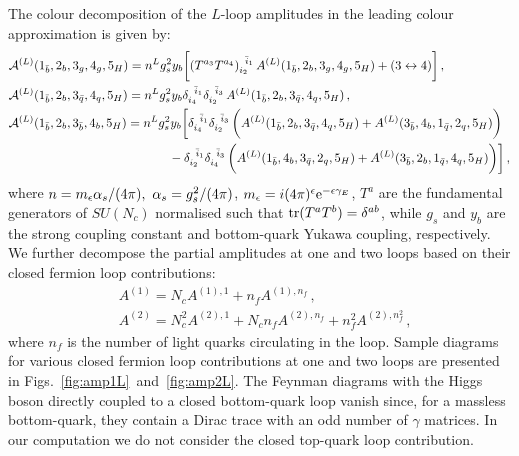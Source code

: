 \documentclass[main.tex]{subfiles}
\begin{document}
The colour decomposition of the $L$-loop amplitudes in the leading colour approximation is given by:
\begin{align}
&\mathcal{A}^{(L)}(1_{\bar b},2_{b},3_{g},4_{g} ,5_{H}) = n^L g_s^2 y_b \bigg[ 
  (T^{a_3} T^{a_4})_{i_2}^{\;\;\bar i_1} \,  A^{(L)}(1_{\bar b},2_{b},3_{g},4_{g} ,5_{H}) + ( 3 \leftrightarrow 4 ) \bigg]\,, \nonumber\\
&\mathcal{A}^{(L)}(1_{\bar b},2_{b},3_{\bar{q}},4_{q} ,5_{H}) = n^L  g_s^2 y_b 
 \delta_{i_4}^{\;\;\bar i_1} \delta_{i_2}^{\;\;\bar i_3}  \,
  A^{(L)}(1_{\bar b},2_{b},3_{\bar{q}},4_{q} ,5_{H}) \,,  \label{eq:colourdecomposition} \\
&\mathcal{A}^{(L)}(1_{\bar b},2_{b},3_{\bar{b}},4_{b} ,5_{H}) = n^L  g_s^2 y_b \bigg[
  \delta_{i_4}^{\;\;\bar i_1} \delta_{i_2}^{\;\;\bar i_3}  \, \biggl( A^{(L)}(1_{\bar b},2_{b},3_{\bar{q}},4_{q} ,5_{H}) + A^{(L)}(3_{\bar b},4_{b},1_{\bar{q}},2_{q} ,5_{H}) \biggr) \,  \nonumber\\
& \hspace{4.5cm} -\delta_{i_2}^{\;\;\bar i_1} \delta_{i_4}^{\;\;\bar i_3}  \, \biggl( A^{(L)}(1_{\bar b},4_{b},3_{\bar{q}},2_{q} ,5_{H}) + A^{(L)}(3_{\bar b},2_{b},1_{\bar{q}},4_{q} ,5_{H}) \biggr) \bigg]\,, 
\nonumber 
\end{align}
where $n= m_\epsilon  \alpha_s/(4\pi),\ \alpha_s = g_s^2/(4\pi)$, $m_\epsilon=i (4\pi)^{\epsilon} \mathrm{e}^{-\epsilon\gamma_E}$, $T^a$ 
are the fundamental generators of $SU(N_c)$ normalised such that $\operatorname{\rm tr}(T^a T^b) = \delta^{ab}$,
while $g_s$ and $y_b$ are the strong coupling constant and bottom-quark Yukawa coupling, respectively. 
We further decompose the partial amplitudes at one and two loops based on their closed fermion loop contributions:
\begin{align}
& A^{(1)} = N_c A^{(1),1} + n_f A^{(1),n_f}  \,,  
\label{eq:NfDecomposition1L} \\
& A^{(2)} = N_c^2 A^{(2),1} + N_c n_f A^{(2),n_f} + n_f^2 A^{(2),n_f^2}  \,, 
\label{eq:NfDecomposition2L}
\end{align}
where $n_f$ is the number of light quarks circulating in the loop.
Sample diagrams for various closed fermion loop contributions at one and two loops are presented in Figs.~\ref{fig:amp1L}~and~\ref{fig:amp2L}.
The Feynman diagrams with the Higgs boson directly coupled to a closed bottom-quark loop vanish since, for a massless bottom-quark, they contain a Dirac trace with an odd number of $\gamma$ matrices. 
In our computation we do not consider the closed top-quark loop contribution. 
\end{document}
